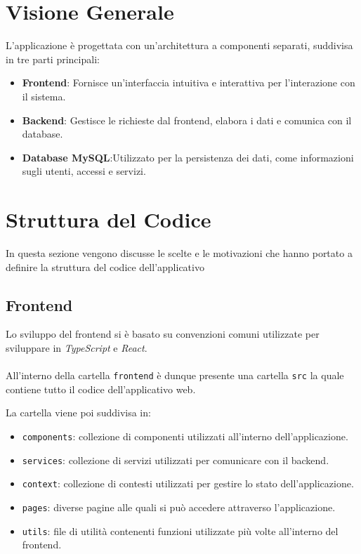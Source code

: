 \documentclass[twoside]{supsistudent}
\begin{document}
\section{Visione Generale}

L'applicazione è progettata con un'architettura a componenti separati, suddivisa in tre parti principali:

\begin{itemize}
  \item \textbf{Frontend}: Fornisce un'interfaccia intuitiva e interattiva per l'interazione con il sistema.
  \item \textbf{Backend}: Gestisce le richieste dal frontend, elabora i dati e comunica con il database.
  \item \textbf{Database MySQL}:Utilizzato per la persistenza dei dati, come informazioni sugli utenti, accessi e servizi.
\end{itemize}



\section{Struttura del Codice}
In questa sezione vengono discusse le scelte e le motivazioni che hanno portato a definire la struttura del codice dell’applicativo

\subsection{Frontend}
Lo sviluppo del frontend si è basato su convenzioni comuni utilizzate per sviluppare in \textit{TypeScript} e \textit{React}.
\\\\
All'interno della cartella \texttt{frontend} è dunque presente una cartella \texttt{src} la quale contiene tutto il codice dell'applicativo web.

La cartella viene poi suddivisa in:

\begin{itemize}
  \item \texttt{components}: collezione di componenti utilizzati all'interno dell'applicazione.
  \item \texttt{services}: collezione di servizi utilizzati per comunicare con il backend.
  \item \texttt{context}: collezione di contesti utilizzati per gestire lo stato dell'applicazione.
  \item \texttt{pages}: diverse pagine alle quali si può accedere attraverso l'applicazione.
  \item \texttt{utils}: file di utilità contenenti funzioni utilizzate più volte all'interno del frontend.
\end{itemize}
\end{document}
